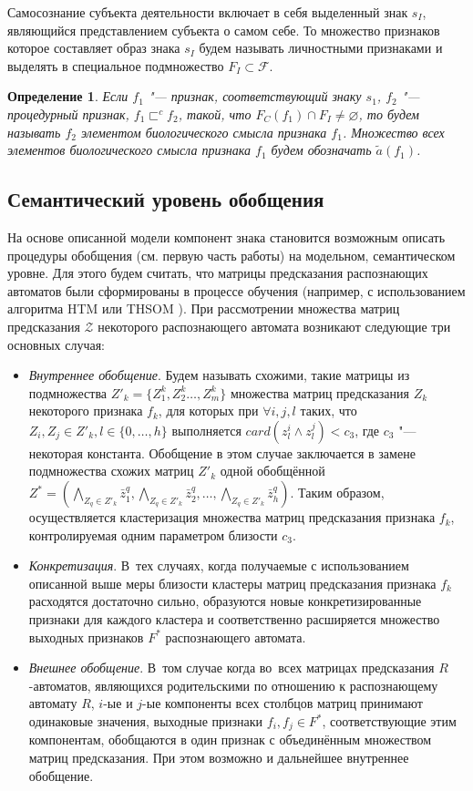 \documentclass[a4paper, 12pt]{article}
\theoremstyle{plain}
\newtheorem{Def}{Определение}
\begin{document}
	Самосознание субъекта деятельности включает в себя выделенный знак $s_I$, являющийся представлением субъекта о самом себе. То множество признаков которое составляет образ знака $s_I$ будем называть личностными признаками и выделять в специальное подмножество $F_I\subset\mathcal F$.
	
	\begin{Def}\label{def:meaning}
		Если $f_1$ "--- признак, соответствующий знаку $s_1$, $f_2$ "--- процедурный признак, $f_1\sqsubset^c f_2$, такой, что $F_C(f_1)\cap F_I\not = \varnothing$, то будем называть $f_2$ элементом биологического смысла признака $f_1$. Множество всех элементов биологического смысла признака $f_1$ будем обозначать $\tilde a(f_1)$.
	\end{Def}
	
	\subsection{Семантический уровень обобщения} На основе описанной модели компонент знака становится возможным описать процедуры обобщения (см. первую часть работы) на модельном, семантическом уровне. Для этого будем считать, что матрицы предсказания распознающих автоматов были сформированы в процессе обучения (например, с использованием алгоритма HTM \cite{Hawkins2009} или THSOM \cite{Koutn2008}). При рассмотрении множества матриц предсказания $\mathcal Z$ некоторого распознающего автомата возникают следующие три основных случая:
	\begin{itemize}
		\item \textit{Внутреннее обобщение}. Будем называть схожими, такие матрицы из подмножества $Z'_k=\{Z_1^k,Z_2^k\dots,Z_m^k\}$ множества матриц предсказания $Z_k$ некоторого признака $f_k$, для которых при $\forall i,j,l$ таких, что $Z_i,Z_j\in Z'_k,l\in\{0,\dots,h\}$ выполняется $card(z_l^i\wedge z_l^j)<c_3$, где $c_3$ "--- некоторая константа. Обобщение в этом случае заключается в замене подмножества схожих матриц $Z'_k$ одной обобщённой $Z^*=(\bigwedge\limits_{Z_q\in Z'_k}\bar z_1^q,\bigwedge\limits_{Z_q\in Z'_k}\bar z_2^q,\dots,\bigwedge\limits_{Z_q\in Z'_k}\bar z_h^q)$. Таким образом, осуществляется кластеризация множества матриц предсказания признака $f_k$, контролируемая одним параметром близости $c_3$.
		\item \textit{Конкретизация}. В~тех случаях, когда получаемые с использованием описанной выше меры близости кластеры матриц предсказания признака $f_k$ расходятся достаточно сильно, образуются новые конкретизированные признаки для каждого кластера и соответственно расширяется множество выходных признаков $F^*$ распознающего автомата.
		\item \textit{Внешнее обобщение}. В~том случае когда во~всех матрицах предсказания $R$-автоматов, являющихся родительскими по отношению к распознающему автомату $R$, $i$-ые и $j$-ые компоненты всех столбцов матриц принимают одинаковые значения, выходные признаки $f_i,f_j\in F^*$, соответствующие этим компонентам, обобщаются в один признак с объединённым множеством матриц предсказания. При этом возможно и дальнейшее внутреннее обобщение.
	\end{itemize}
	
\end{document}
